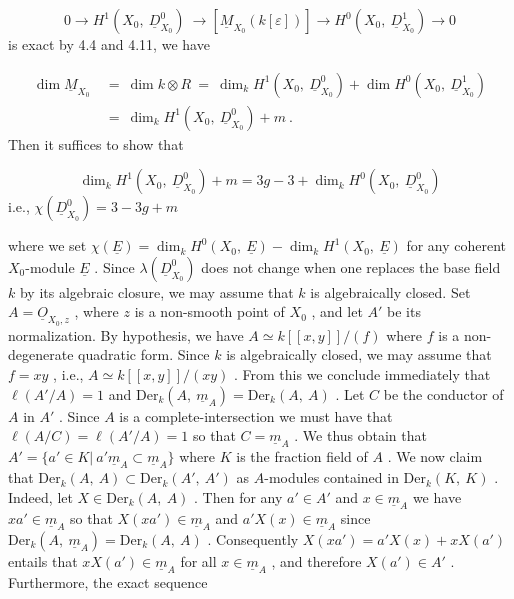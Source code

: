 \begin{equation*}
0 \rightarrow H^1(X_0,\ \underline{D}^0_{X_0})\ \rightarrow [\underline{M}_{X_0}(k[\varepsilon])] \rightarrow H^0(X_0,\ \underline{D}^1_{X_0}) \rightarrow 0
\end{equation*}
is exact by 4.4 and 4.11, we have

\begin{equation*}
\begin{aligned}
\dim \underline{M}_{X_0} \ &= \ \dim k \otimes R \ = \ \dim_k H^1(X_0,\ \underline{D}^0_{X_0}) + \dim H^0(X_0,\ \underline{D}^1_{X_0})\\
&= \ \dim_k H^1(X_0,\ \underline{D}^0_{X_0}) + m \ .
\end{aligned}
\end{equation*}
Then it suffices to show that

\begin{equation*}
\dim_k H^1(X_0,\ \underline{D}^0_{X_0}) + m = 3g - 3 + \dim_k H^0(X_0,\ \underline{D}^0_{X_0})
\end{equation*}
i.e.,  $\chi(\underline{D}^0_{X_0}) = 3 - 3g + m$

where we set  $\chi(\underline{E}) = \dim_k H^0(X_0,\ \underline{E}) - \dim_k H^1(X_0,\ \underline{E})$  for any coherent  $X_0$-module  $\underline{E}$ . Since  $\lambda(\underline{D}^0_{X_0})$  does not change when one replaces the base field  $k$  by its algebraic closure, we may assume that  $k$  is algebraically closed. Set  $A = \underline{O}_{X_0,z}$ , where  $z$  is a non-smooth point of  $X_0$ , and let  $A'$  be its normalization. By hypothesis, we have  $A \simeq k[[x,y]]/(f)$  where  $f$  is a non-degenerate quadratic form. Since  $k$  is algebraically closed, we may assume that  $f = xy$ , i.e., $A \simeq k[[x,y]]/(xy)$ . From this we conclude immediately that  $\ell(A'/A) = 1$  and  $\mathrm{Der}_k(A,\ \underline{m}_A) = \mathrm{Der}_k(A,\ A)$ . Let  $C$  be the conductor of  $A$  in  $A'$ . Since $A$ is a complete-intersection we must have that  $\ell(A/C) = \ell(A'/A) = 1$  so that  $C = \underline{m}_A$ . We thus obtain that  $A' = \{a' \in K |\ a'\underline{m}_A \subset \underline{m}_A\}$  where  $K$  is the fraction field of  $A$ . We now claim that  $\mathrm{Der}_k(A,\ A) \subset \mathrm{Der}_k(A',\ A')$  as $A$-modules contained in  $\mathrm{Der}_k(K,\ K)$ . Indeed, let  $X \in \mathrm{Der}_k(A,\ A)$ . Then for any  $a' \in A'$  and
$x \in \underline{m}_A$  we have  $xa' \in \underline{m}_A$  so that  $X(xa') \in \underline{m}_A$  and  $a'X(x) \in \underline{m}_A$  since  $\mathrm{Der}_k(A,\ \underline{m}_A) = \mathrm{Der}_k(A,\ A)$ . Consequently  $X(xa') = a'X(x) + xX(a')$  entails that  $xX(a') \in \underline{m}_A$  for all  $x \in \underline{m}_A$ , and therefore  $X(a') \in A'$ . Furthermore, the exact sequence

